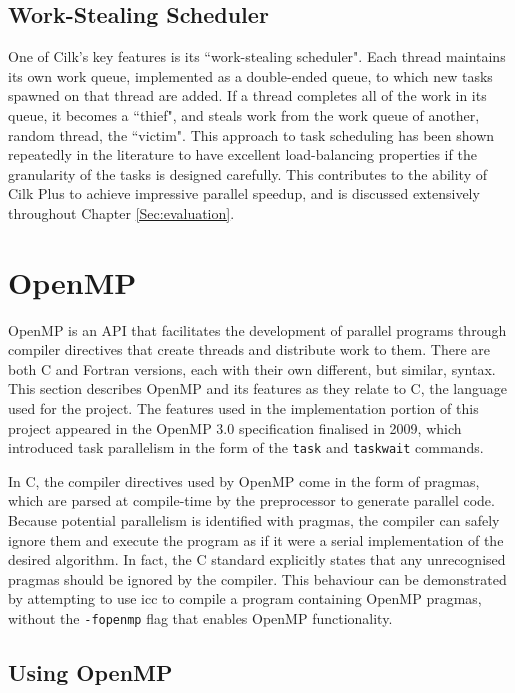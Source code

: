 \documentclass{report}
\begin{document}
\subsection{Work-Stealing Scheduler} \label{Sec:workstealingscheduler}

One of Cilk's key features is its ``work-stealing scheduler". Each thread maintains its own work queue, implemented as a double-ended queue, to which new tasks spawned on that thread are added\cite{Blumofe95}. If a thread completes all of the work in its queue, it becomes a ``thief", and steals work from the work queue of another, random thread, the ``victim". This approach to task scheduling has been shown repeatedly in the literature to have excellent load-balancing properties if the granularity of the tasks is designed carefully\cite{Tousimojarad14}. This contributes to the ability of Cilk Plus to achieve impressive parallel speedup, and is discussed extensively throughout Chapter \ref{Sec:evaluation}.

\section{OpenMP} \label{Sec:openmp}

OpenMP is an API that facilitates the development of parallel programs through compiler directives that create threads and distribute work to them\cite{openmpsite}. There are both C and Fortran versions, each with their own different, but similar, syntax. This section describes OpenMP and its features as they relate to C, the language used for the project. The features used in the implementation portion of this project appeared in the OpenMP 3.0 specification finalised in 2009\cite{openmpsite}, which introduced task parallelism in the form of the \verb!task! and \verb!taskwait! commands.

In C, the compiler directives used by OpenMP come in the form of pragmas, which are parsed at compile-time by the preprocessor to generate parallel code. Because potential parallelism is identified with pragmas, the compiler can safely ignore them and execute the program as if it were a serial implementation of the desired algorithm. In fact, the C standard explicitly states that any unrecognised pragmas should be ignored by the compiler\cite{Hook05}. This behaviour can be demonstrated by attempting to use icc to compile a program containing OpenMP pragmas, without the \verb!-fopenmp! flag that enables OpenMP functionality.

\subsection{Using OpenMP} \label{Sec:usingopenmp}
\end{document}
